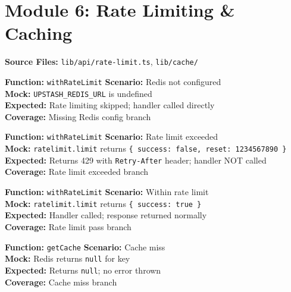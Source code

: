 ﻿\documentclass[12pt,a4paper]{report}
\newcommand{\ptwo}{\textbf{\color{p2orange}P2}}
\newcommand{\pthree}{\textbf{\color{p3blue}P3}}
\begin{document}
\section{Module 6: Rate Limiting \& Caching}

\textbf{Source Files:} \texttt{lib/api/rate-limit.ts}, \texttt{lib/cache/}

\begin{tcolorbox}[testbox,title={RATE-001 \hfill \ptwo}]
\textbf{Function:} \texttt{withRateLimit} \quad \textbf{Scenario:} Redis not configured \\
\textbf{Mock:} \texttt{UPSTASH\_REDIS\_URL} is undefined \\
\textbf{Expected:} Rate limiting skipped; handler called directly \\
\textbf{Coverage:} Missing Redis config branch
\end{tcolorbox}

\begin{tcolorbox}[testbox,title={RATE-002 \hfill \ptwo}]
\textbf{Function:} \texttt{withRateLimit} \quad \textbf{Scenario:} Rate limit exceeded \\
\textbf{Mock:} \texttt{ratelimit.limit} returns \texttt{\{ success: false, reset: 1234567890 \}} \\
\textbf{Expected:} Returns 429 with \texttt{Retry-After} header; handler NOT called \\
\textbf{Coverage:} Rate limit exceeded branch
\end{tcolorbox}

\begin{tcolorbox}[testbox,title={RATE-003 \hfill \ptwo}]
\textbf{Function:} \texttt{withRateLimit} \quad \textbf{Scenario:} Within rate limit \\
\textbf{Mock:} \texttt{ratelimit.limit} returns \texttt{\{ success: true \}} \\
\textbf{Expected:} Handler called; response returned normally \\
\textbf{Coverage:} Rate limit pass branch
\end{tcolorbox}

\begin{tcolorbox}[testbox,title={CACHE-001 \hfill \pthree}]
\textbf{Function:} \texttt{getCache} \quad \textbf{Scenario:} Cache miss \\
\textbf{Mock:} Redis returns \texttt{null} for key \\
\textbf{Expected:} Returns \texttt{null}; no error thrown \\
\textbf{Coverage:} Cache miss branch
\end{tcolorbox}
\end{document}
